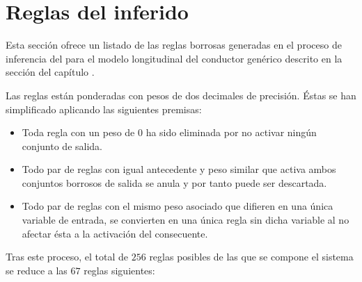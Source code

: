 \chapter{Reglas del  inferido}
\label{ch:derived-controller-rules}

Esta sección ofrece un listado de las reglas borrosas generadas en el proceso de inferencia del  para el modelo longitudinal del conductor genérico descrito en la sección  del capítulo .

Las reglas están ponderadas con pesos de dos decimales de precisión. Éstas se han simplificado aplicando las siguientes premisas:

\begin{itemize}
	\item Toda regla con un peso de $0$ ha sido eliminada por no activar ningún conjunto de salida.
	\item Todo par de reglas con igual antecedente y peso similar que activa ambos conjuntos borrosos de salida se anula y por tanto puede ser descartada.
	\item Todo par de reglas con el mismo peso asociado que difieren en una única variable de entrada, se convierten en una única regla sin dicha variable al no afectar ésta a la activación del consecuente.
\end{itemize}

Tras este proceso, el total de $256$ reglas posibles de las que se compone el sistema se reduce a las $67$ reglas siguientes:


